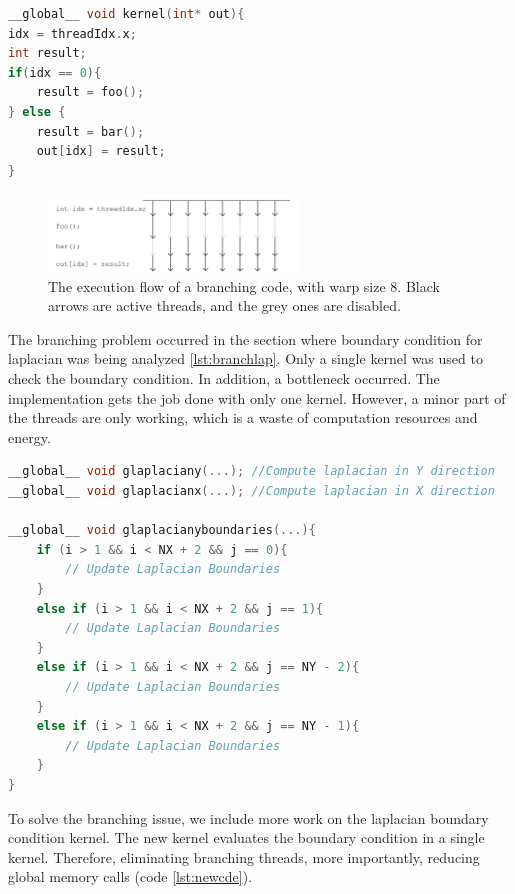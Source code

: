 \begin{lstlisting}[language=C++, label={lst:branch}, caption={Branching threads}]
__global__ void kernel(int* out){
idx = threadIdx.x;
int result;
if(idx == 0){
	result = foo();
} else {
	result = bar();
	out[idx] = result;
}
\end{lstlisting}

\begin{figure}[htbp]
	\centering
		\includegraphics[width=0.6\textwidth]{Figures/threads.png}
		\smallskip
	\caption[he execution flow]{The execution flow of a branching code, with warp size 8. Black arrows are active threads, and the grey ones are disabled.}
	\label{fig:threads}
\end{figure}

The branching problem occurred in the section where boundary condition for laplacian was being analyzed \ref{lst:branchlap}. Only a single kernel was used to check the boundary condition. In addition, a bottleneck occurred. The implementation gets the job done with only one kernel. However, a minor part of the threads are only working, which is a waste of computation resources and energy.

\begin{lstlisting}[language=C++, label={lst:branchlap}, caption={Branching problem in the laplacian boundary condition evaluation}]
__global__ void glaplaciany(...); //Compute laplacian in Y direction
__global__ void glaplacianx(...); //Compute laplacian in X direction

__global__ void glaplacianyboundaries(...){
    if (i > 1 && i < NX + 2 && j == 0){
     	// Update Laplacian Boundaries
    }
    else if (i > 1 && i < NX + 2 && j == 1){
  		// Update Laplacian Boundaries
  	}
    else if (i > 1 && i < NX + 2 && j == NY - 2){
        // Update Laplacian Boundaries
    }
    else if (i > 1 && i < NX + 2 && j == NY - 1){
        // Update Laplacian Boundaries
    }
}
\end{lstlisting}

To solve the branching issue, we include more work on the laplacian boundary condition kernel. The new kernel evaluates the boundary condition in a single kernel. Therefore, eliminating branching threads, more importantly, reducing global memory calls (code \ref{lst:newcde}).

